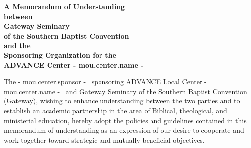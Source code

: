 \documentclass{article}
\newcommand{\advancemastercentername}{ {{- mou.center.name -}} }
\newcommand{\sponsoringorgname}{ {{- mou.center.sponsor -}} }
\newcommand{\advancelocalcentername}{ {{- mou.center.name -}} }
\begin{document}
\begin{center}
\Large \textbf{A Memorandum of Understanding} \\
\textbf{between} \\
\textbf{Gateway Seminary} \\
\textbf{of the Southern Baptist Convention} \\
\textbf{and the} \\
\textbf{Sponsoring Organization for the} \\
\textbf{ADVANCE Center \advancemastercentername}
\end{center}

The \sponsoringorgname\ sponsoring ADVANCE Local Center \advancelocalcentername\ and Gateway Seminary of the Southern Baptist Convention (Gateway), wishing to enhance understanding between the two parties and to establish an academic partnership in the area of Biblical, theological, and ministerial education, hereby adopt the policies and guidelines contained in this memorandum of understanding as an expression of our desire to cooperate and work together toward strategic and mutually beneficial objectives.
\end{document}
